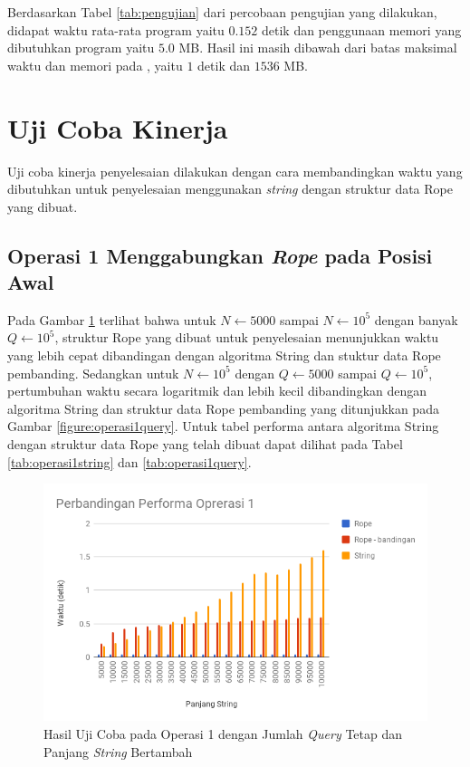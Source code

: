 Berdasarkan Tabel \ref{tab:pengujian} dari percobaan pengujian yang dilakukan, didapat waktu rata-rata program yaitu $0.152$ detik dan penggunaan memori yang dibutuhkan program yaitu $5.0$ MB. Hasil ini masih dibawah dari batas maksimal waktu dan memori pada \problem{}, yaitu $1$ detik dan $1536$ MB.

\section{Uji Coba Kinerja}
\label{section:ujikinerja}
Uji coba kinerja penyelesaian \problem{} dilakukan dengan cara membandingkan waktu yang dibutuhkan untuk penyelesaian menggunakan \textit{string} dengan struktur data Rope yang dibuat.
\subsection{Operasi 1 Menggabungkan \textit{Rope} pada Posisi Awal}
Pada Gambar \ref{figure:operasi1string} terlihat bahwa untuk $N \gets 5000$ sampai $N \gets 10^5$ dengan banyak $Q \gets 10^5$, struktur Rope yang dibuat untuk penyelesaian \problem{} menunjukkan waktu yang lebih cepat dibandingan dengan algoritma String dan stuktur data Rope pembanding. Sedangkan untuk $N \gets 10^5$ dengan $Q \gets 5000$ sampai $Q \gets 10^5$, pertumbuhan waktu secara logaritmik dan lebih kecil dibandingkan dengan algoritma String dan struktur data Rope pembanding yang ditunjukkan pada Gambar \ref{figure:operasi1query}. Untuk tabel performa antara algoritma String dengan struktur data Rope yang telah dibuat dapat dilihat pada Tabel \ref{tab:operasi1string} dan \ref{tab:operasi1query}.
\begin{figure}
\centerline{ \includegraphics[scale=0.45]{assets/images/operasi1-string.png}}
\caption{Hasil Uji Coba pada Operasi 1 dengan Jumlah \textit{Query} Tetap dan Panjang \textit{String} Bertambah}
\label{figure:operasi1string}
\end{figure}

